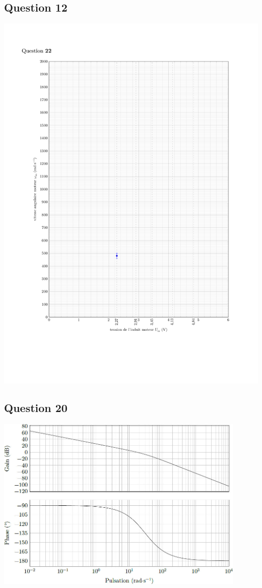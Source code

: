\subsection*{Question 12}
\begin{center}
\includegraphics[width=1.0\textwidth]{images/courbe_dr.pdf}
\end{center}

\subsection*{Question 20}
\begin{center}
\includegraphics[width=0.9\textwidth]{images/image_fig18.jpg}
\end{center}

